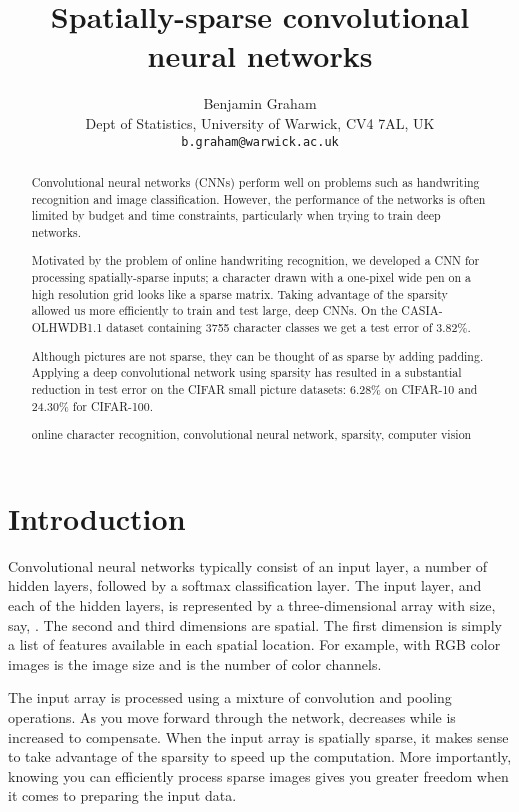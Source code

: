 \documentclass{article}
\title{Spatially-sparse convolutional neural networks}
\author{
Benjamin Graham\\
{\small Dept of Statistics, University of Warwick, CV4 7AL, UK}\\
{\small \tt b.graham@warwick.ac.uk}\\
}
\numberwithin{equation}{subsection}
\begin{document}
\maketitle
\begin{abstract}
Convolutional neural networks (CNNs) perform well on problems such as handwriting recognition and image classification.
However, the performance of the networks is often limited by budget and time constraints, particularly when trying to train deep networks.

Motivated by the problem of online handwriting recognition, we developed a CNN for processing spatially-sparse inputs; a character drawn with a one-pixel wide pen on a high resolution grid looks like a sparse matrix. Taking advantage of the sparsity allowed us more efficiently to train and test large, deep CNNs. On the CASIA-OLHWDB1.1 dataset containing 3755 character classes we get a test error of 3.82\%.

Although pictures are not sparse, they can be thought of as sparse by adding padding. Applying a deep convolutional network using sparsity has resulted in a substantial reduction in test error on the CIFAR small picture datasets: 6.28\% on CIFAR-10 and 24.30\% for CIFAR-100.


 online character recognition, convolutional neural network, sparsity, computer vision
\end{abstract}


\section{Introduction}
Convolutional neural networks typically consist of an input layer, a number of hidden layers, followed by a softmax classification layer. The input layer, and each of the hidden layers, is represented by a three-dimensional array with size, say, . The second and third dimensions are spatial. The first dimension is simply a list of features available in each spatial location. For example, with RGB color images  is the image size and  is the number of color channels.

The input array is processed using a mixture of convolution and pooling operations.
As you move forward through the network,  decreases while  is increased to compensate.
When the input array is spatially sparse, it makes sense to take advantage of the sparsity to speed up the computation. More importantly, knowing you can efficiently process sparse images gives you greater freedom when it comes to preparing the input data.
\end{document}
